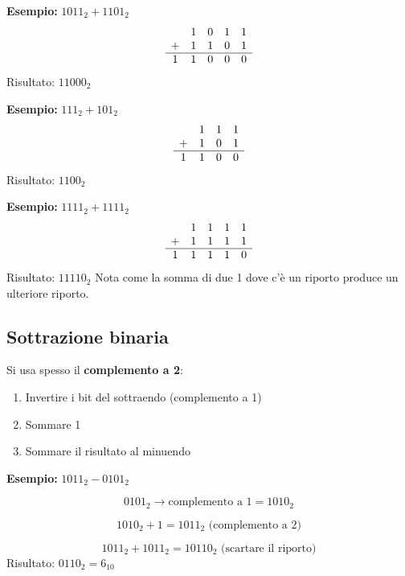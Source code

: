 \documentclass[12pt,a4paper]{article}
\begin{document}
\textbf{Esempio:} $1011_2 + 1101_2$
\[
\begin{array}{c c c c c}
 & 1 & 0 & 1 & 1 \\
+ & 1 & 1 & 0 & 1 \\
\hline
1 & 1 & 0 & 0 & 0
\end{array}
\]
Risultato: $11000_2$

\textbf{Esempio:} $111_2 + 101_2$
\[
\begin{array}{c c c c}
    & 1 & 1 & 1 \\
+   & 1 & 0 & 1 \\
\hline
1 & 1 & 0 & 0
\end{array}
\]
Risultato: $1100_2$

\textbf{Esempio:} $1111_2 + 1111_2$
\[
\begin{array}{c c c c c}
    & 1 & 1 & 1 & 1 \\
+   & 1 & 1 & 1 & 1 \\
\hline
1 & 1 & 1 & 1 & 0
\end{array}
\]
Risultato: $11110_2$
Nota come la somma di due 1 dove c'è un riporto produce un ulteriore riporto.

\subsection{Sottrazione binaria}

Si usa spesso il \textbf{complemento a 2}:
\begin{enumerate}
    \item Invertire i bit del sottraendo (complemento a 1)
    \item Sommare 1
    \item Sommare il risultato al minuendo
\end{enumerate}

\textbf{Esempio:} $1011_2 - 0101_2$

\[
0101_2 \rightarrow \text{complemento a 1} = 1010_2
\]

\[
1010_2 + 1 = 1011_2 \text{ (complemento a 2)}
\]

\[
1011_2 + 1011_2 = 10110_2 \text{ (scartare il riporto)}
\]
Risultato: $0110_2 = 6_{10}$
\end{document}
